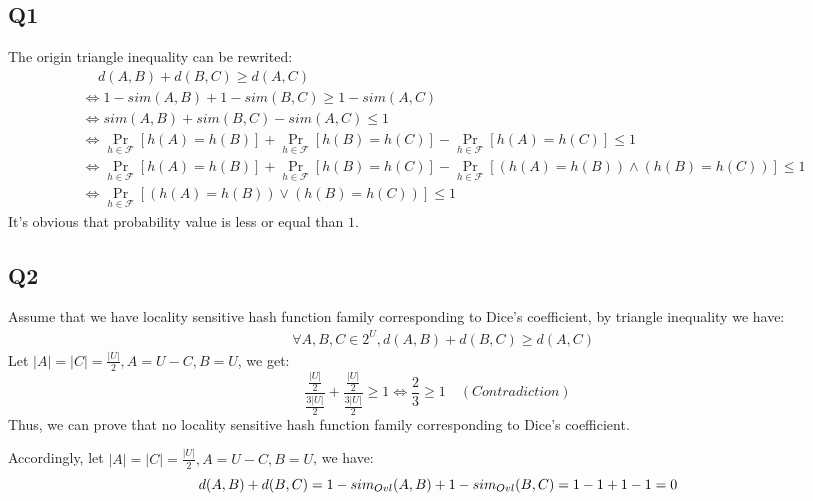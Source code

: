 \documentclass[a4paper, 12pt, titlepage]{article}
\begin{document}
\subsection{Q1}
The origin triangle inequality can be rewrited:
\begin{equation}
    \begin{aligned}
        &\quad \, d(A, B) + d(B, C) \geq d(A, C) \\
        &\Leftrightarrow 1 - sim(A, B) + 1 - sim(B, C) \geq 1 - sim(A, C) \\
        &\Leftrightarrow sim(A, B) + sim(B, C) - sim(A, C) \leq 1 \\
        &\Leftrightarrow \Pr_{h \in \mathcal F} \left[ h(A) = h(B) \right] + \Pr_{h \in \mathcal F} \left[ h(B) = h(C) \right] - \Pr_{h \in \mathcal F} \left[ h(A) = h(C) \right] \leq 1 \\
        &\Leftrightarrow \Pr_{h \in \mathcal F} \left[ h(A) = h(B) \right] + \Pr_{h \in \mathcal F} \left[ h(B) = h(C) \right] - \Pr_{h \in \mathcal F} \left[ (h(A) = h(B)) \wedge (h(B) = h(C)) \right] \leq 1 \\
        &\Leftrightarrow \Pr_{h \in \mathcal F} \left[ (h(A) = h(B)) \vee (h(B) = h(C)) \right] \leq 1
    \end{aligned}
\end{equation}
It's obvious that probability value is less or equal than $1$.

\subsection{Q2}
Assume that we have locality sensitive hash function family corresponding to Dice's coefficient, by triangle inequality we have:
\begin{equation}
    \begin{aligned}
        &\forall A, B, C \in 2^{U}, d(A, B) + d(B, C) \geq d(A, C)
    \end{aligned}
\end{equation}
Let $|A| = |C| = \frac{|U|}{2}, A = U - C, B = U$, we get:
\[
    \frac{\frac{|U|}{2}}{\frac{3|U|}{2}} + \frac{\frac{|U|}{2}}{\frac{3|U|}{2}} \geq 1 \Leftrightarrow \frac{2}{3} \geq 1 \quad (Contradiction)
\]
Thus, we can prove that no locality sensitive hash function family corresponding to Dice's coefficient.

Accordingly, let $|A| =  |C| = \frac{|U|}{2}, A = U - C, B = U$, we have:
\[
    d(A, B) + d(B, C) = 1 - sim_{Ovl}(A, B) + 1 - sim_{Ovl}(B, C) \\
                      = 1 - 1 + 1 - 1
                      = 0
\]     
\end{document}
